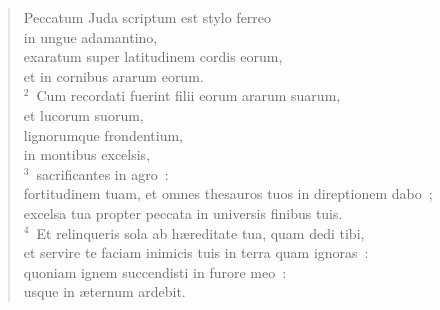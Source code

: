 \begin{flushleft}\begin{verse}\vspace{-19pt}\hspace{6pt}Peccatum Juda scriptum est stylo ferreo\\\hspace{6pt} in ungue adamantino,\\ exaratum super latitudinem cordis eorum,\\ et in cornibus ararum eorum.\\
${}^{2}$~Cum recordati fuerint filii eorum ararum suarum,\\ et lucorum suorum,\\ lignorumque frondentium,\\ in montibus excelsis,\\
${}^{3}$~sacrificantes in agro~:\\ fortitudinem tuam, et omnes thesauros tuos in direptionem dabo~;\\ excelsa tua propter peccata in universis finibus tuis.\\
${}^{4}$~Et relinqueris sola ab h\ae reditate tua, quam dedi tibi,\\ et servire te faciam inimicis tuis in terra quam ignoras~:\\ quoniam ignem succendisti in furore meo~:\\ usque in \ae ternum ardebit.\end{verse}\end{flushleft}


